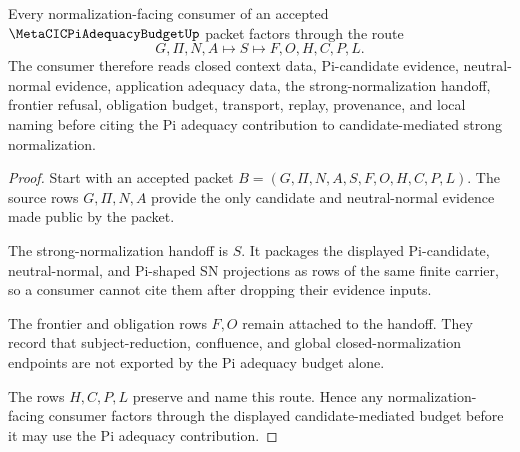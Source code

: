 \begin{theorem}
\label{thm:metacic-pi-adequacy-budget-sn-handoff}
Every normalization-facing consumer of an accepted $\MetaCICPiAdequacyBudgetUp$ packet factors through the route
$$
G,\Pi,N,A
\longmapsto
S
\longmapsto
F,O,H,C,P,L .
$$
The consumer therefore reads closed context data, Pi-candidate evidence, neutral-normal evidence, application adequacy data, the strong-normalization handoff, frontier refusal, obligation budget, transport, replay, provenance, and local naming before citing the Pi adequacy contribution to candidate-mediated strong normalization.
\end{theorem}
\begin{proof}
Start with an accepted packet $B=(G,\Pi,N,A,S,F,O,H,C,P,L)$. The source rows $G,\Pi,N,A$ provide the only candidate and neutral-normal evidence made public by the packet.

The strong-normalization handoff is $S$. It packages the displayed Pi-candidate, neutral-normal, and Pi-shaped SN projections as rows of the same finite carrier, so a consumer cannot cite them after dropping their evidence inputs.

The frontier and obligation rows $F,O$ remain attached to the handoff. They record that subject-reduction, confluence, and global closed-normalization endpoints are not exported by the Pi adequacy budget alone.

The rows $H,C,P,L$ preserve and name this route. Hence any normalization-facing consumer factors through the displayed candidate-mediated budget before it may use the Pi adequacy contribution.
\end{proof}



